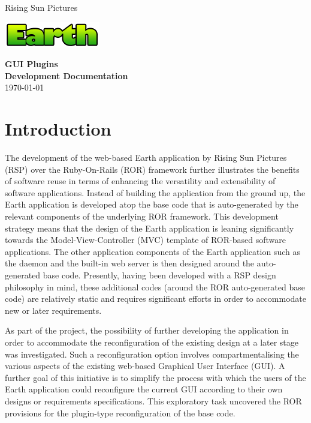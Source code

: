 \documentclass{article}
\begin{document}
\begin{titlepage}
    \begin{center}
        Rising Sun Pictures \\
        \vspace{1cm}
        \begin{center}                
        \includegraphics{fig/earth.png} \\
        \end{center}
        \vspace{5cm}
        {\LARGE\bf GUI Plugins} \\
        \vspace{5cm}
        {\LARGE\bf Development Documentation} \\
        \vspace{6cm}
        \today
    \end{center}
\end{titlepage}

\tableofcontents
\listoffigures
\newpage

\section{Introduction} %

\noindent
The development of the web-based Earth application by Rising Sun Pictures (RSP) over the Ruby-On-Rails (ROR) framework further illustrates the benefits of software reuse in terms of enhancing the versatility and extensibility of software applications. Instead of building the application from the ground up, the Earth application is developed atop the base code that is auto-generated by the relevant components of the underlying ROR framework. This development strategy means that the design of the Earth application is leaning significantly towards the Model-View-Controller (MVC) template of ROR-based software applications. The other application components of the Earth application such as the daemon and the built-in web server is then designed around the auto-generated base code. Presently, having been developed with a RSP design philosophy in mind, these additional codes (around the ROR auto-generated base code) are relatively static and requires significant efforts in order to accommodate new or later requirements. 

\noindent
As part of the project, the possibility of further developing the application in order to accommodate the reconfiguration of the existing design at a later stage was investigated. Such a reconfiguration option involves compartmentalising the various aspects of the existing web-based Graphical User Interface (GUI). A further goal of this initiative is to simplify the process with which the users of the Earth application could reconfigure the current GUI according to their own designs or requirements specifications. This exploratory task uncovered the ROR provisions for the plugin-type reconfiguration of the base code. 
\end{document}
